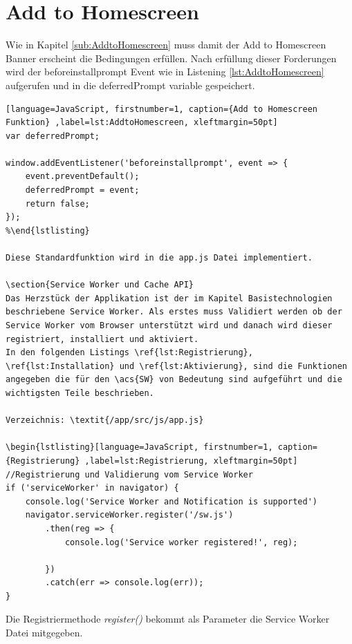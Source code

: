 \section{Add to Homescreen}
Wie in Kapitel \ref{sub:AddtoHomescreen} muss damit der Add to Homescreen Banner erscheint die Bedingungen erfüllen.
Nach erfüllung dieser Forderungen wird der beforeinstallprompt Event wie in Listening \ref{lst:AddtoHomescreen} aufgerufen und in die deferredPrompt variable gespeichert.

\begin{lstlisting}[language=JavaScript, firstnumber=1, caption={Add to Homescreen Funktion} ,label=lst:AddtoHomescreen, xleftmargin=50pt]
var deferredPrompt;

window.addEventListener('beforeinstallprompt', event => {
    event.preventDefault();
    deferredPrompt = event;
    return false;
});
%\end{lstlisting}

Diese Standardfunktion wird in die app.js Datei implementiert. 

\section{Service Worker und Cache API}
Das Herzstück der Applikation ist der im Kapitel Basistechnologien beschriebene Service Worker. Als erstes muss Validiert werden ob der Service Worker vom Browser unterstützt wird und danach wird dieser registriert, installiert und aktiviert.
In den folgenden Listings \ref{lst:Registrierung}, \ref{lst:Installation} und \ref{lst:Aktivierung}, sind die Funktionen angegeben die für den \acs{SW} von Bedeutung sind aufgeführt und die wichtigsten Teile beschrieben.

Verzeichnis: \textit{/app/src/js/app.js}

\begin{lstlisting}[language=JavaScript, firstnumber=1, caption={Registrierung} ,label=lst:Registrierung, xleftmargin=50pt]
//Registrierung und Validierung vom Service Worker
if ('serviceWorker' in navigator) {
    console.log('Service Worker and Notification is supported')
    navigator.serviceWorker.register('/sw.js')
        .then(reg => {
            console.log('Service worker registered!', reg);

        })
        .catch(err => console.log(err));
}
\end{lstlisting}
Die Registriermethode \textit{register()} bekommt als Parameter die Service Worker Datei mitgegeben.

